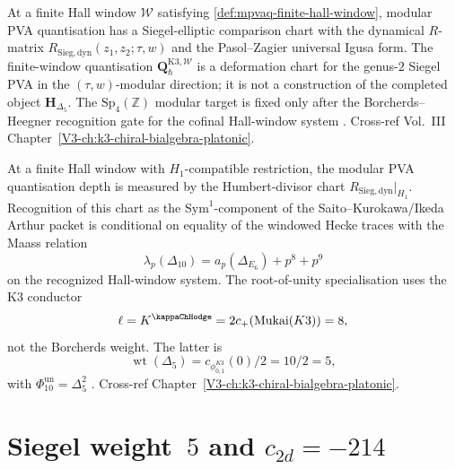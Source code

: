 \begin{remark}
\label{rem:mpvaq-1}
At a finite Hall window $\mathcal W$ satisfying
\cref{def:mpvaq-finite-hall-window}, modular PVA quantisation has a
Siegel-elliptic comparison chart with the dynamical $R$-matrix
$R_{\mathrm{Sieg,dyn}}(z_1, z_2;\tau, w)$ and the Pasol--Zagier
universal Igusa form.  The finite-window quantisation
$\mathbf Q_{\hbar}^{\mathrm{K3},\mathcal W}$ is a deformation chart for
the genus-$2$ Siegel PVA in the $(\tau,w)$-modular direction; it is not a
construction of the completed object $\mathbf H_{\Delta_5}$.  The
$\mathrm{Sp}_4(\mathbb Z)$ modular target is fixed only after the
Borcherds--Heegner recognition gate for the cofinal Hall-window system
\cite{PasolZagier2013,Felder1995}. Cross-ref Vol.~III
Chapter~\ref{V3-ch:k3-chiral-bialgebra-platonic}.
\end{remark}

\begin{remark}
\label{rem:mpvaq-2}
At a finite Hall window with $H_1$-compatible restriction, the modular
PVA quantisation depth is measured by the Humbert-divisor chart
$R_{\mathrm{Sieg,dyn}}|_{H_1}$.  Recognition of this chart as the
$\mathrm{Sym}^1$-component of the Saito--Kurokawa/Ikeda Arthur packet is
conditional on equality of the windowed Hecke traces with the Maass
relation
\[
\lambda_p(\Delta_{10}) = a_p(\Delta_{E_6}) + p^8 + p^9
\]
on the recognized Hall-window system.  The root-of-unity specialisation
uses the K3 conductor
\[
 \ell = K^{\kappaChHodge}
 =2c_+(\mathrm{Mukai}(K3))=8,
\]
not the Borcherds weight. The latter is
\[
 \operatorname{wt}(\Delta_5)
 =c_{\phi_{0,1}^{K3}}(0)/2=10/2=5,
\]
with $\Phi_{10}^{\mathrm{un}}=\Delta_5^2$
\cite{Andrianov1974,Ikeda2001,Lusztig1990}. Cross-ref
Chapter~\ref{V3-ch:k3-chiral-bialgebra-platonic}.
\end{remark}

\section{Siegel weight~$5$ and $c_{2d} = -214$}
\label{sec:mpvaq-supplement-ii}

